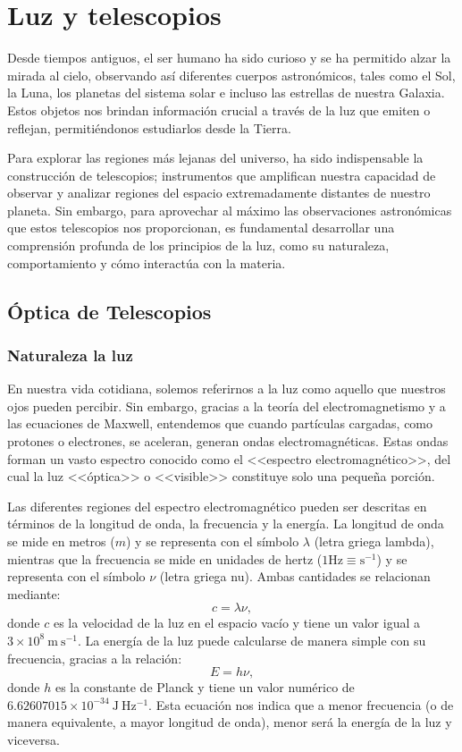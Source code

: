 \chapter{Luz y telescopios}
Desde tiempos antiguos, el ser humano ha sido curioso y se ha permitido alzar la mirada al cielo, observando así diferentes cuerpos astronómicos, tales como el Sol, la Luna, los planetas del sistema solar e incluso las estrellas de nuestra Galaxia. Estos objetos nos brindan información crucial a través de la luz que emiten o reflejan, permitiéndonos estudiarlos desde la Tierra.

Para explorar las regiones más lejanas del universo, ha sido indispensable la construcción de telescopios; instrumentos que amplifican nuestra capacidad de observar y analizar regiones del espacio extremadamente distantes de nuestro planeta. Sin embargo, para aprovechar al máximo las observaciones astronómicas que estos telescopios nos proporcionan, es fundamental desarrollar una comprensión profunda de los principios de la luz, como su naturaleza, comportamiento y cómo interactúa con la materia.

\section{Óptica de Telescopios}
\subsection{Naturaleza la luz}
En nuestra vida cotidiana, solemos referirnos a la luz como aquello que nuestros ojos pueden percibir. Sin embargo, gracias a la teoría del electromagnetismo y a las ecuaciones de Maxwell, entendemos que cuando partículas cargadas, como protones o electrones, se aceleran, generan ondas electromagnéticas. Estas ondas forman un vasto espectro conocido como el <<espectro electromagnético>>, del cual la luz <<óptica>> o <<visible>> constituye solo una pequeña porción. 

Las diferentes regiones del espectro electromagnético pueden ser descritas en términos de la longitud de onda, la frecuencia y la energía. La longitud de onda se mide en metros ($ m $) y se representa con el símbolo $ \lambda $ (letra griega lambda), mientras que la frecuencia se mide en unidades de hertz ($ \mathrm{1 Hz \equiv s^{-1}} $) y se representa con el símbolo $\nu$ (letra griega nu). Ambas cantidades se relacionan mediante:
\[ c = \lambda \nu, \]
donde $c$ es la velocidad de la luz en el espacio vacío y tiene un valor igual a $ 3\times 10^8 ~\mathrm{m ~ s^{-1}} $. La energía de la luz puede calcularse de manera simple con su frecuencia, gracias a la relación:
\[ E = h \nu, \]
donde $ h $ es la constante de Planck y tiene un valor numérico de $ 6.62607015\times 10^{-34} ~\mathrm{J~Hz^{-1}} $. Esta ecuación nos indica que a menor frecuencia (o de manera equivalente, a mayor longitud de onda), menor será la energía de la luz y viceversa.

